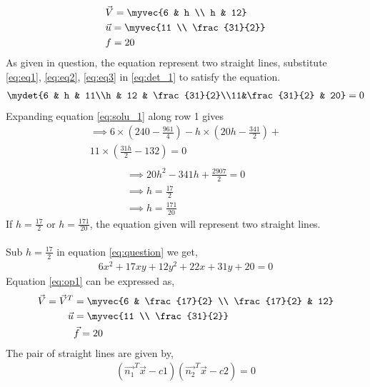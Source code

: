\begin{align}
    &\vec{V}=\myvec{6 & h \\ h & 12} \label{eq:eq1}\\ 
    &\vec{u}=\myvec{11 \\ \frac{31}{2}}  \label{eq:eq2}\\
    & f=20 \label{eq:eq3}
\end{align}
As given in question, the equation represent two straight lines, substitute \eqref{eq:eq1}, \eqref{eq:eq2}, \eqref{eq:eq3} in \eqref{eq:det_1} to satisfy the equation.
\begin{align}
    \mydet{6 & h & 11\\h & 12 & \frac{31}{2}\\11&\frac{31}{2} & 20} = 0 \label{eq:solu_1}
\end{align}
Expanding equation \eqref{eq:solu_1} along row 1 gives
\begin{multline*}
\implies 6\times(240 - \frac{961}{4}) -h\times(20h - \frac{341}{2}) +\\ 11\times(\frac{31h}{2}-132) = 0\\
\end{multline*}
\begin{align}
\implies 20h^{2}-341h+\frac{2907}{2} = 0\\
\implies \boxed{h=\frac{17}{2}} \label{eq:result1}\\
\implies \boxed{h=\frac{171}{20}} \label{eq:result2}
\end{align}
If $h=\frac{17}{2}$ or $h=\frac{171}{20}$, the equation given will represent two straight lines.\\
\\
Sub $h=\frac{17}{2}$ in equation \eqref{eq:question} we get,
\begin{align}
6x^2+17xy+12y^2+22x+31y+20=0 \label{eq:op1}
\end{align}
Equation \eqref{eq:op1} can be expressed as,
\begin{align}
\vec{V}=\vec{V}^T&=\myvec{6 & \frac{17}{2} \\ \frac{17}{2} & 12} \label{eq:eq1vec}\\
\vec{u}&=\myvec{11 \\ \frac{31}{2}} \label{eq:eq2vec}\\
&\vec{f}=20
\end{align}
The pair of straight lines are given by,
\begin{align}
    (\vec{n_1}^{T}\vec{x} - c1)(\vec{n_2}^{T}\vec{x} - c2)=0\label{eq:maineq1}
\end{align}
